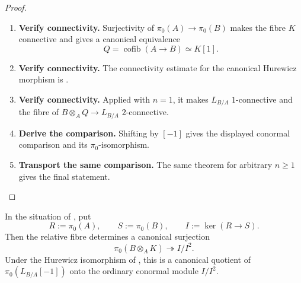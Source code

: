 \begin{proof}
\leavevmode
\begin{enumerate}[label=\textup{(\arabic*)}]
    \item \textbf{Verify connectivity.}
    Surjectivity of \(\pi_0(A)\to\pi_0(B)\) makes the fibre \(K\) connective and gives a canonical
    equivalence
    \[
        Q=\operatorname{cofib}(A\to B)\simeq K[1].
    \]

    \item \textbf{Verify connectivity.}
    The connectivity estimate for the canonical Hurewicz morphism is
    \cite[Theorem~7.4.3.12]{LurieHigherAlgebra}.

    \item \textbf{Verify connectivity.}
    Applied with \(n=1\), it makes \(L_{B/A}\) \(1\)-connective and the fibre of
    \(B\otimes_AQ\to L_{B/A}\) \(2\)-connective.

    \item \textbf{Derive the comparison.}
    Shifting by \([-1]\) gives the displayed conormal comparison and its
    \(\pi_0\)-isomorphism.

    \item \textbf{Transport the same comparison.}
    The same theorem for arbitrary \(n\geq1\) gives the final statement.
\end{enumerate}
\end{proof}

\begin{lemma}
\label{lem:derived-conormal-classical-quotient}
In the situation of , put
\[
    R:=\pi_0(A),
    \qquad
    S:=\pi_0(B),
    \qquad
    I:=\ker(R\to S).
\]
Then the relative fibre determines a canonical surjection
\[
    \pi_0(B\otimes_AK)
    \twoheadrightarrow
    I/I^2.
\]
Under the Hurewicz isomorphism of
, this is a canonical quotient of
\(\pi_0(L_{B/A}[-1])\) onto the ordinary conormal module \(I/I^2\).
\end{lemma}

